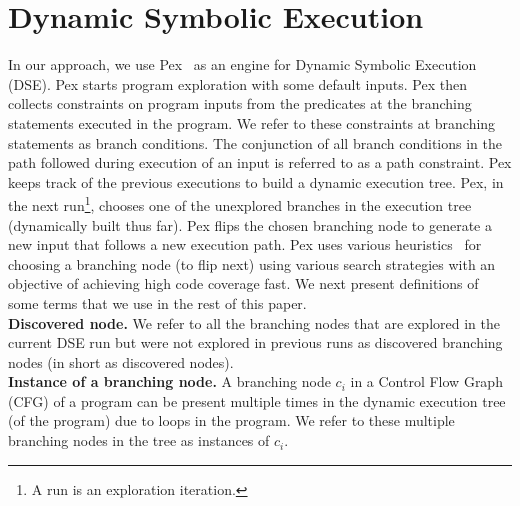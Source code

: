 \vspace{-2ex}
\section{Dynamic Symbolic Execution}
\vspace{-2ex}
In our approach, we use Pex~\cite{Pex} as an engine for Dynamic Symbolic Execution (DSE). Pex starts program exploration with some default inputs. Pex then collects constraints on program inputs from the predicates at the branching statements executed in the program. We refer to these constraints at branching statements as branch conditions. 
The conjunction of all branch conditions in the path followed during execution of an input is referred to as a path constraint. Pex keeps track of the previous executions to build a dynamic execution tree. Pex, in the next run\footnote{\scriptsize{A run is an exploration iteration.}}, chooses one of the unexplored branches in the execution tree (dynamically built thus far). Pex flips the chosen branching node to generate a new input that follows a new execution path. 
Pex uses various heuristics~\cite{fitnex} for choosing a branching node (to flip next) using various search strategies with an objective of achieving high code coverage fast. We next present definitions of some terms that we use in the rest of this paper.
\\ \textbf{Discovered node. }We refer to all the branching nodes that are explored in the current DSE run but were not explored in previous runs as discovered branching nodes (in short as discovered nodes).
\\ \textbf{Instance of a branching node. }A branching node $c_i$ in a Control Flow Graph (CFG) of a program can be present multiple times in the dynamic execution tree (of the program) due to loops in the program. We refer to these multiple branching nodes in the tree as instances of $c_i$.
 
